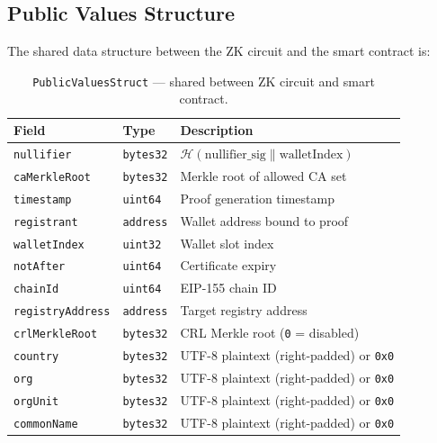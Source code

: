 \documentclass[11pt, a4paper]{article}
\begin{document}
\subsection{Public Values
Structure}\label{public-values-structure}

The shared data structure between the ZK circuit and the smart contract
is:

\begin{table}[ht]
\centering
\small
\caption{\texttt{PublicValuesStruct} --- shared between ZK circuit and smart contract.}
\label{tab:public-values}
\begin{tabular}{@{}lll@{}}
\toprule
Field & Type & Description \\
\midrule
\texttt{nullifier} & \texttt{bytes32} & $\mathcal{H}(\text{nullifier\_sig} \| \text{walletIndex})$ \\
\texttt{caMerkleRoot} & \texttt{bytes32} & Merkle root of allowed CA set \\
\texttt{timestamp} & \texttt{uint64} & Proof generation timestamp \\
\texttt{registrant} & \texttt{address} & Wallet address bound to proof \\
\texttt{walletIndex} & \texttt{uint32} & Wallet slot index \\
\texttt{notAfter} & \texttt{uint64} & Certificate expiry \\
\texttt{chainId} & \texttt{uint64} & EIP-155 chain ID \\
\texttt{registryAddress} & \texttt{address} & Target registry address \\
\texttt{crlMerkleRoot} & \texttt{bytes32} & CRL Merkle root (\texttt{0} = disabled) \\
\texttt{country} & \texttt{bytes32} & UTF-8 plaintext (right-padded) or \texttt{0x0} \\
\texttt{org} & \texttt{bytes32} & UTF-8 plaintext (right-padded) or \texttt{0x0} \\
\texttt{orgUnit} & \texttt{bytes32} & UTF-8 plaintext (right-padded) or \texttt{0x0} \\
\texttt{commonName} & \texttt{bytes32} & UTF-8 plaintext (right-padded) or \texttt{0x0} \\
\bottomrule
\end{tabular}
\end{table}
\end{document}
